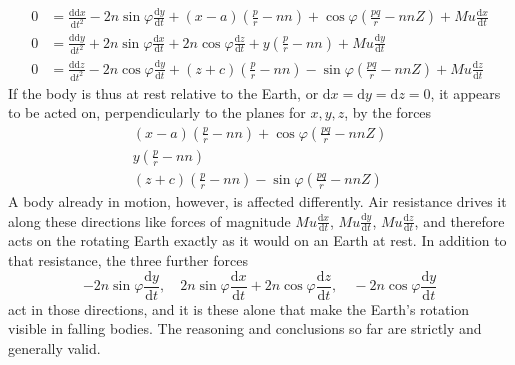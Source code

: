 \[
\begin{aligned}
0&=\tfrac{\mathrm{dd}x}{\mathrm{d}t^2}-2n\sin\varphi\tfrac{\mathrm{d}y}{\mathrm{d}t}+(x-a)(\tfrac pr-nn)+\cos\varphi(\tfrac{pq}{r}-nnZ)+Mu\tfrac{\mathrm{d}x}{\mathrm{d}t}\\
0&=\tfrac{\mathrm{dd}y}{\mathrm{d}t^2}+2n\sin\varphi\tfrac{\mathrm{d}x}{\mathrm{d}t}+2n\cos\varphi\tfrac{\mathrm{d}z}{\mathrm{d}t}+y(\tfrac pr-nn)+Mu\tfrac{\mathrm{d}y}{\mathrm{d}t}\\
0&=\tfrac{\mathrm{dd}z}{\mathrm{d}t^2}-2n\cos\varphi\tfrac{\mathrm{d}y}{\mathrm{d}t}+(z+c)(\tfrac pr-nn)-\sin\varphi(\tfrac{pq}{r}-nnZ)+Mu\tfrac{\mathrm{d}z}{\mathrm{d}t}
\end{aligned}
\]
If the body is thus at rest relative to the Earth, or $\mathrm{d}x=\mathrm{d}y=\mathrm{d}z=0$, it appears to be acted on, perpendicularly to the planes for $x,y,z$, by the forces
\[
\begin{gathered}
(x-a)(\tfrac pr-nn)+\cos\varphi(\tfrac{pq}{r}-nnZ)\\
y(\tfrac pr-nn)\\
(z+c)(\tfrac pr-nn)-\sin\varphi(\tfrac{pq}{r}-nnZ)
\end{gathered}
\]
A body already in motion, however, is affected differently. Air resistance drives it along these directions like forces of magnitude $Mu\tfrac{\mathrm{d}x}{\mathrm{d}t}$, $Mu\tfrac{\mathrm{d}y}{\mathrm{d}t}$, $Mu\tfrac{\mathrm{d}z}{\mathrm{d}t}$, and therefore acts on the rotating Earth exactly as it would on an Earth at rest. In addition to that resistance, the three further forces
\[
-2n\sin\varphi\frac{\mathrm{d}y}{\mathrm{d}t},\quad 2n\sin\varphi\frac{\mathrm{d}x}{\mathrm{d}t}+2n\cos\varphi\frac{\mathrm{d}z}{\mathrm{d}t},\quad -2n\cos\varphi\frac{\mathrm{d}y}{\mathrm{d}t}
\]
act in those directions, and it is these alone that make the Earth's rotation visible in falling bodies. The reasoning and conclusions so far are strictly and generally valid.

